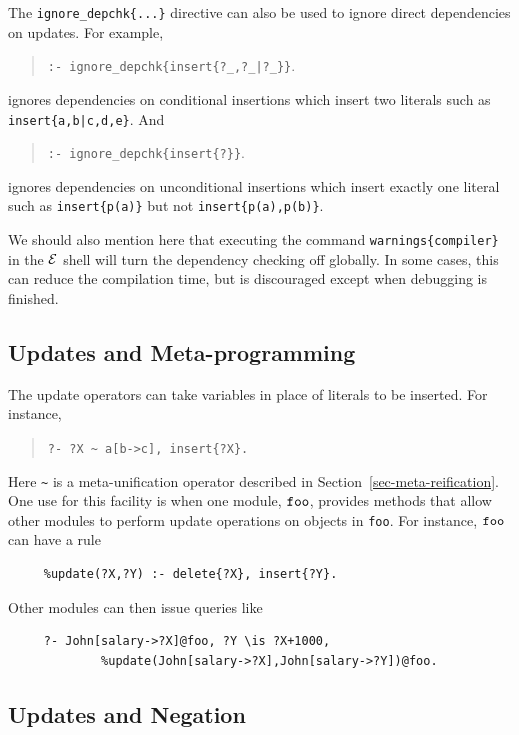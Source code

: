 \documentclass[11pt]{article}
\newcommand{\ERGO}{\mbox{\ensuremath{\cal{E}}\smaller{{\sc{RGO}}}}\xspace}
\newcommand{\FLSYSTEM}{\ERGO}
\begin{document}
The {\tt ignore\_depchk\{...\}} directive can also be used to ignore direct
dependencies on updates. For example, 
\begin{quote}
{\tt :- ignore\_depchk\{insert\{?\_,?\_|?\_\}\}}.
\end{quote}
\noindent ignores dependencies on conditional insertions which insert
two literals such as {\tt insert\{a,b|c,d,e\}}. And
\begin{quote}
{\tt :- ignore\_depchk\{insert\{?\}\}}.
\end{quote}
\noindent ignores dependencies on unconditional insertions which insert
exactly one literal such as {\tt insert\{p(a)\}} but not {\tt insert\{p(a),p(b)\}}. 

We should also mention here that executing the command
\texttt{warnings\{compiler\}} in the \FLSYSTEM shell will turn the dependency
checking off globally. In some cases, this can 
reduce the compilation time, but is discouraged except when debugging is
finished.



\subsection{Updates and Meta-programming}

The update operators can take variables in place of literals to be
inserted.  For instance,
\begin{quote}
 {\tt ?-  ?X \verb|~| a[b->c], insert\{?X\}.}
\end{quote}
  Here \verb|~| is a meta-unification operator described in
  Section~\ref{sec-meta-reification}.
One use for this facility is when one module, $\tt foo$, provides methods that
allow other modules to perform update operations on objects in {\tt foo}.
For instance, $\tt foo$ can have a rule
\begin{verbatim}
     %update(?X,?Y) :- delete{?X}, insert{?Y}.
\end{verbatim}
Other modules can then issue queries like
\begin{verbatim}
     ?- John[salary->?X]@foo, ?Y \is ?X+1000,
             %update(John[salary->?X],John[salary->?Y])@foo.  
\end{verbatim}

\subsection{Updates and Negation}
\end{document}
